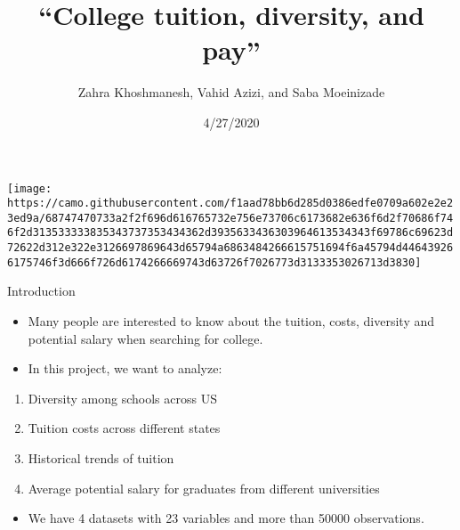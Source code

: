 \documentclass[
  ignorenonframetext,
]{beamer}
\title{\Large ``College tuition, diversity, and pay''}
\author{Zahra Khoshmanesh, Vahid Azizi, and Saba Moeinizade}
\date{4/27/2020}
\providecommand{\tightlist}{%
  \setlength{\itemsep}{0pt}\setlength{\parskip}{0pt}}
\begin{document}
\frame{\titlepage}

\begin{frame}

\texttt{[image: https://camo.githubusercontent.com/f1aad78bb6d285d0386edfe0709a602e2e23ed9a/68747470733a2f2f696d616765732e756e73706c6173682e636f6d2f70686f746f2d313533333835343737353434362d3935633436303964613534343f69786c69623d72622d312e322e3126697869643d65794a6863484266615751694f6a45794d446439266175746f3d666f726d6174266669743d63726f7026773d3133353026713d3830]}

\end{frame}

\begin{frame}{Introduction}
\protect\hypertarget{introduction}{}

\begin{itemize}
\tightlist
\item
  Many people are interested to know about the tuition, costs, diversity
  and potential salary when searching for college.
\item
  In this project, we want to analyze:
\end{itemize}

\begin{enumerate}
\tightlist
\item
  Diversity among schools across US
\item
  Tuition costs across different states
\item
  Historical trends of tuition
\item
  Average potential salary for graduates from different universities
\end{enumerate}

\begin{itemize}
\tightlist
\item
  We have 4 datasets with 23 variables and more than 50000 observations.
\end{itemize}

\end{frame}
\end{document}
